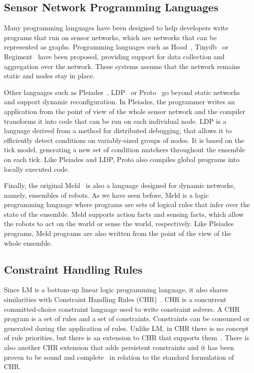 \subsection{Sensor Network Programming Languages}

Many programming languages have been designed to help developers write programs
that run on sensor networks, which are networks that can be represented as
graphs.  Programming languages such as
Hood~\cite{Whitehouse:2004:HNA:990064.990079},
Tinydb~\cite{Madden:2005:TAQ:1061318.1061322} or
Regiment~\cite{Newton:2007:RMS:1236360.1236422} have been proposed, providing
support for data collection and aggregation over the network. These systems
assume that the network remains static and nodes stay in place.

Other languages such as Pleiades~\cite{Kothari:2007:REP:1250734.1250757},
LDP~\cite{4543691} or Proto~\cite{Beal:2006:IEE:1137236.1137354} go beyond
static networks and support dynamic reconfiguration. In Pleiades, the
programmer writes an application from the point of view of the whole
sensor network and the compiler transforms it into code that can be run on
each individual node.  LDP is a language derived from a method for
distributed debugging, that allows it to efficiently detect conditions on
variably-sized groups of nodes. It is based on the tick model, generating
a new set of condition matchers throughout the ensemble on each tick.
Like Pleiades and LDP, Proto also compiles global programs into locally
executed code.

Finally, the original Meld~\cite{ashley-rollman-iclp09} is also a language
designed for dynamic networks, namely, ensembles of robots. As we have seen
before, Meld is a logic programming language where programs are sets of logical
rules that infer over the state of the ensemble. Meld supports action facts and
sensing facts, which allow the robots to act on the world or sense the world,
respectively. Like Pleiades programs, Meld programs are also written from the
point of the view of the whole ensemble.

\subsection{Constraint Handling Rules}

Since LM is a bottom-up linear logic programming language, it also shares
similarities with Constraint Handling Rules
(CHR)~\cite{Betz:2005kx,Betz:2013:LBA:2422085.2422086}.  CHR is a concurrent
committed-choice constraint language used to write constraint solvers. A CHR
program is a set of rules and a set of constraints. Constraints can be consumed
or generated during the application of rules. Unlike LM, in CHR there is no
concept of rule priorities, but there is an extension to CHR that supports
them~\cite{DeKoninck:2007:URP:1273920.1273924}. There is also another CHR
extension that adds persistent constraints and it has been proven to be sound
and complete~\cite{DBLP:journals/corr/abs-1007-3829} in relation to the standard
formulation of CHR.

